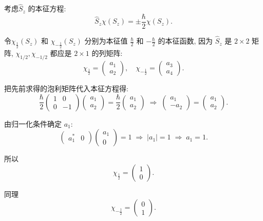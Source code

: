 考虑$\hat{S}_z$ 的本征方程:
\[
\hat{S}_z \chi(S_z) = \pm \frac{\hbar}{2} \chi(S_z).
\]

令$\chi_{\frac{1}{2}}(S_z)$ 和 $\chi_{-\frac{1}{2}}(S_z)$
分别为本征值 $\frac{\hbar}{2}$ 和 $-\frac{\hbar}{2}$ 的本征函数,
因为 $\hat{S}_z$ 是 $2 \times 2$ 矩阵, $\chi_{1/2}, \chi_{-1/2}$ 都应是 $2 \times 1$ 的列矩阵:
\[
\chi_{\frac{1}{2}} = \begin{pmatrix} a_1 \\ a_2 \end{pmatrix}, \quad
\chi_{-\frac{1}{2}} = \begin{pmatrix} a_3 \\ a_4 \end{pmatrix}.
\]

把先前求得的泡利矩阵代入本征方程得:
\[
\frac{\hbar}{2} \begin{pmatrix} 1 & 0 \\ 0 & -1 \end{pmatrix}
\begin{pmatrix} a_1 \\ a_2 \end{pmatrix}
= \frac{\hbar}{2} \begin{pmatrix} a_1 \\ a_2 \end{pmatrix}
\;\Longrightarrow\;
\begin{pmatrix} a_1 \\ -a_2 \end{pmatrix}
= \begin{pmatrix} a_1 \\ a_2 \end{pmatrix}.
\]

由归一化条件确定 $a_1$:
\[
\begin{pmatrix} a_1^* & 0 \end{pmatrix}
\begin{pmatrix} a_1 \\ 0 \end{pmatrix} = 1
\;\Longrightarrow\; |a_1| = 1 \;\Longrightarrow\; a_1 = 1.
\]

所以
\[
\chi_{\frac{1}{2}} = \begin{pmatrix} 1 \\ 0 \end{pmatrix}.
\]

同理
\[
\chi_{-\frac{1}{2}} = \begin{pmatrix} 0 \\ 1 \end{pmatrix}.
\]
